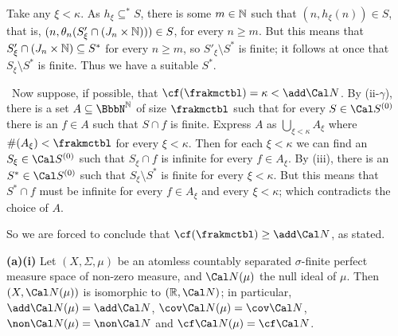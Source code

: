 {Take any $\xi<\kappa$.   As $h_{\xi}\subseteq^*S$, there is some
$m\in\Bbb N$ such that $(n,h_{\xi}(n))\in S$, that is,
$(n,\theta_n(S'_{\xi}\cap(J_n\times\Bbb N)))\in S$, for every $n\ge m$.
But this means that $S'_{\xi}\cap(J_n\times\Bbb N)\subseteq S^*$ for
every $n\ge m$, so $S'_{\xi}\setminus S^*$ is finite;  it follows at
once that $S_{\xi}\setminus S^*$ is finite.   Thus we have a suitable
$S^*$.\ \Qed

\medskip

 \Quer\ Now suppose, if possible, that
$\cf(\frakmctbl)=\kappa<\add\Cal N$.   By (ii-$\gamma$), there is a
set $A\subseteq\NN$ of
size $\frakmctbl$ such that for every $S\in\Cal S^{(0)}$ there is an
$f\in A$ such that $S\cap f$ is finite.   Express $A$ as
$\bigcup_{\xi<\kappa}A_{\xi}$ where $\#(A_{\xi})<\frakmctbl$ for every
$\xi<\kappa$.   Then for each $\xi<\kappa$ we can find an
$S_{\xi}\in\Cal S^{(0)}$ such that $S_{\xi}\cap f$ is infinite for every
$f\in A_{\xi}$.   By (iii), there is an $S^*\in\Cal S^{(0)}$ such that
$S_{\xi}\setminus S^*$ is finite for every $\xi<\kappa$.   But this
means that $S^*\cap f$ must be infinite for every $f\in A_{\xi}$ and
every $\xi<\kappa$;  which contradicts the choice of $A$.\ \Bang

So we are forced to conclude that $\cf(\frakmctbl)\ge\add\Cal N$, as
stated.
}%

 {\bf (a)(i)} Let $(X,\Sigma,\mu)$ be an atomless countably
separated $\sigma$-finite
perfect measure space of non-zero measure,
and $\Cal N(\mu)$ the null ideal of $\mu$.   Then
$(X,\Cal N(\mu))$ is isomorphic to $(\Bbb R,\Cal N)$;  in particular,
$\add\Cal N(\mu)=\add\Cal N$, $\cov\Cal N(\mu)=\cov\Cal N$,
$\non\Cal N(\mu)=\non\Cal N$ and $\cf\Cal N(\mu)=\cf\Cal N$.

